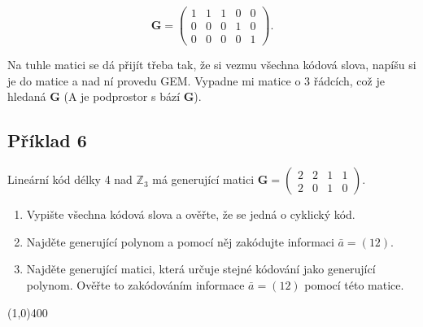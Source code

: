 \documentclass{article}
\begin{document}
\[ \mathbf{G} = \begin{pmatrix}
		1 & 1 & 1 & 0 & 0\\
	  0 & 0 & 0 & 1 & 0\\
	  0 & 0 & 0 & 0 & 1
	\end{pmatrix}. \]  

Na tuhle matici se dá přijít třeba tak, že si vezmu všechna kódová slova, napíšu si je do matice a nad ní provedu GEM. Vypadne mi matice o 3 řádcích, což je hledaná $\mathbf{G}$ (A je podprostor s bází $\mathbf{G}$).

\subsection{\label{priklad3-6}Příklad 6}
Lineární kód délky 4 nad $\mathbb{Z}_3$ má generující matici $\mathbf{G} = 
\begin{pmatrix}
  2 & 2 & 1 & 1 \\
  2 & 0 & 1 & 0
\end{pmatrix}$.

\begin{enumerate}
	\item Vypište všechna kódová slova a ověřte, že se jedná o cyklický kód. 
	\item Najděte generující polynom a pomocí něj zakódujte informaci $\bar{a} = (12)$.
	\item Najděte generující matici, která určuje stejné kódování jako generující polynom. Ověřte to zakódováním informace $\bar{a} = (12)$ pomocí této matice.
\end{enumerate}

\line(1,0){400}
\end{document}

